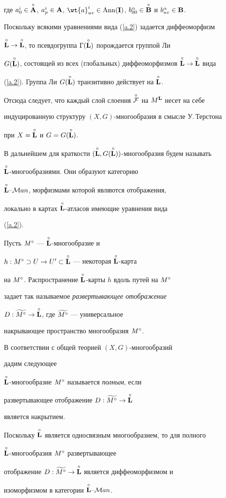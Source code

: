 где $a^i_0\in\Ao$, $a^i_p\in\A$, ${\wt{a}}^i_{uv}\in 


\Ann(\I)$, $b^\alpha_{00}\in\Bo$ и $b^\alpha_{uv}\in\B$.


Поскольку всякими уравнениями вида (\ref{a.2}) задается диффеоморфизм


$\overset{\circ}{\bold L}{}\to\overset{\circ}{\bold L}{}$, то псевдогруппа $\Gamma(\overset{\circ}{\bold L}{})$ порождается группой Ли


$G(\overset{\circ}{\bold L}{})$, состоящей из всех (глобальных) диффеоморфизмов $\overset{\circ}{\bold L}{}\to\overset{\circ}{\bold L}{}$ вида


(\ref{a.2}). Группа Ли $G(\overset{\circ}{\bold L}{})$ транзитивно действует на $\overset{\circ}{\bold L}{}$.


Отсюда следует, что каждый слой слоения $\overset{\circ}{\cal F}{}$ на $M^{\bold L}$ несет на себе


индуцированную структуру $(X,G)$-многообразия в смысле У.\,Терстона


\cite{Apan} при $X=\overset{\circ}{\bold L}{}$ и $G=G(\overset{\circ}{\bold L}{})$.


В дальнейшем для краткости $(\overset{\circ}{\bold L}{},G(\overset{\circ}{\bold L}{}))$-многообразия будем называть


$\overset{\circ}{\bold L}{}$-многообразиями. Они образуют категорию


$\overset{\circ}{\bold L}{}\text{--}{\cal M}an$, морфизмами которой являются отображения,


локально в картах $\overset{\circ}{\bold L}{}$-атласов имеющие уравнения вида


(\ref{a.2}).





Пусть ${M^\circ}$ --- $\overset{\circ}{\bold L}{}$-многообразие и


$h: {M^\circ}\supset U\to U'\subset\overset{\circ}{\bold L}{}$ --- некоторая $\overset{\circ}{\bold L}{}$-карта


на ${M^\circ}$. Распространение $\overset{\circ}{\bold L}{}$-карты $h$ вдоль путей на ${M^\circ}$


задает так называемое {\it развертывающее отображение}


$D:\widetilde{{M^\circ}}\to \overset{\circ}{\bold L}{}$, где $\widetilde{{M^\circ}}$ --- универсальное


накрывающее пространство многообразия ${M^\circ}$.


В соответствии с общей теорией $(X,G)$-многообразий \cite{Apan}


дадим следующее





\begin{defn}


$\overset{\circ}{\bold L}{}$-многообразие ${M^\circ}$ называется {\it полным}, если


развертывающее отображение $D:{\widetilde{M^\circ}}\to \overset{\circ}{\bold L}{}$


является накрытием.





Поскольку $\overset{\circ}{\bold L}{}$ является односвязным многообразием, то для полного


$\overset{\circ}{\bold L}{}$-многообразия ${M^\circ}$ развертывающее


отображение $D:{\widetilde{M^\circ}}\to\overset{\circ}{\bold L}{}$ является диффеоморфизмом и


изоморфизмом в категории $\overset{\circ}{\bold L}{}\text{--}{\cal M}an$.


\end{defn}





